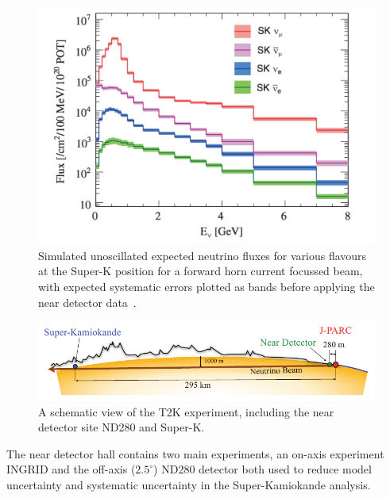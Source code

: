 \begin{figure}[h!]
\centering
  \centering
\includegraphics[width=\textwidth]{figures/ND280Flux.jpeg}
\vspace{2mm}
\caption{Simulated unoscillated expected neutrino fluxes for various flavours at the Super-K position for a forward horn current focussed beam, with expected systematic errors plotted as bands before applying the near detector data~\cite{21T2K}.}
\label{fig:ND280Flux}
\end{figure}

\begin{figure}[h!]
\centering
  \centering
\includegraphics[width=\textwidth]{figures/T2KBeam.png}
\vspace{2mm}
\caption{A schematic view of the T2K experiment, including the near detector site ND280 and Super-K.}
\label{fig:T2K}
\end{figure}

The near detector hall contains two main experiments, an on-axis experiment INGRID and the off-axis ($2.5^\circ$) ND280 detector both used to reduce model uncertainty and systematic uncertainty in the Super-Kamiokande analysis. %

